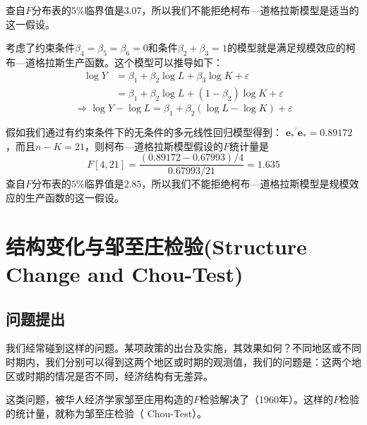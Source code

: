 	查自$ F $分布表的$ 5\% $临界值是3.07，所以我们不能拒绝柯布—道格拉斯模型是适当的这一假设。
	
	考虑了约束条件$ \beta_{4}=\beta_{5}=\beta_{6}=0 $和条件$ \beta_{2}+\beta_{3}=1 $的模型就是满足规模效应的柯布—道格拉斯生产函数。这个模型可以推导如下：
	\begin{equation}
		\begin{aligned}
			\log Y & = \beta_{1}+\beta_{2} \log L+\beta_{3} \log K+\varepsilon \\
			       & = \beta_{1}+\beta_{2} \log L+\left(1-\beta_{2}\right) \log K+\varepsilon
		\end{aligned}
	\end{equation}
	$$ \Longrightarrow \log Y-\log L=\beta_{1}+\beta_{2}(\log L-\log K)+\varepsilon $$
	
	假如我们通过有约束条件下的无条件的多元线性回归模型得到：
	$ {\boldsymbol{e}_{*}}^{\prime} \boldsymbol{e}_{*}=0.89172 $，而且$ n-K=21  $，则柯布—道格拉斯模型假设的$ F $统计量是
	$$ F\left [ 4,21 \right ] =\frac{(0.89172-0.67993) / 4}{0.67993 / 21}=1.635 $$
	查自$ F $分布表的$ 5\% $临界值是$ 2.85 $，所以我们不能拒绝柯布—道格拉斯模型是规模效应的生产函数的这一假设。
	
	\section{结构变化与邹至庄检验(Structure Change and Chou-Test)}
	\subsection{问题提出}
	我们经常碰到这样的问题。某项政策的出台及实施，其效果如何？不同地区或不同时期内，我们分别可以得到这两个地区或时期的观测值，我们的问题是：这两个地区或时期的情况是否不同，经济结构有无差异。
	
	这类问题，被华人经济学家邹至庄用构造的$ F $检验解决了（1960年）。这样的$ F $检验的统计量，就称为邹至庄检验（ Chou-Test）。
